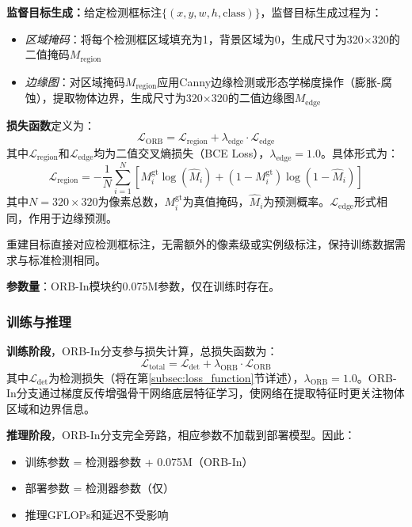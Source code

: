 \documentclass[journal]{IEEEtran}
\begin{document}
\textbf{监督目标生成：}给定检测框标注$\{(x, y, w, h, \text{class})\}$，监督目标生成过程为：
\begin{itemize}
    \item \textit{区域掩码}：将每个检测框区域填充为1，背景区域为0，生成尺寸为320$\times$320的二值掩码$M_{\text{region}}$
    \item \textit{边缘图}：对区域掩码$M_{\text{region}}$应用Canny边缘检测或形态学梯度操作（膨胀-腐蚀），提取物体边界，生成尺寸为320$\times$320的二值边缘图$M_{\text{edge}}$
\end{itemize}

\textbf{损失函数}定义为：
\begin{equation}
\mathcal{L}_{\text{ORB}} = \mathcal{L}_{\text{region}} + \lambda_{\text{edge}} \cdot \mathcal{L}_{\text{edge}}
\end{equation}
其中$\mathcal{L}_{\text{region}}$和$\mathcal{L}_{\text{edge}}$均为二值交叉熵损失（BCE Loss），$\lambda_{\text{edge}}=1.0$。具体形式为：
\begin{equation}
\mathcal{L}_{\text{region}} = -\frac{1}{N}\sum_{i=1}^{N}\left[M_i^{\text{gt}}\log(\hat{M}_i) + (1-M_i^{\text{gt}})\log(1-\hat{M}_i)\right]
\end{equation}
其中$N=320\times 320$为像素总数，$M_i^{\text{gt}}$为真值掩码，$\hat{M}_i$为预测概率。$\mathcal{L}_{\text{edge}}$形式相同，作用于边缘预测。

重建目标直接对应检测框标注，无需额外的像素级或实例级标注，保持训练数据需求与标准检测相同。

\textbf{参数量}：ORB-In模块约0.075M参数，仅在训练时存在。

\subsubsection{训练与推理}

\textbf{训练阶段}，ORB-In分支参与损失计算，总损失函数为：
\begin{equation}
\mathcal{L}_{\text{total}} = \mathcal{L}_{\text{det}} + \lambda_{\text{ORB}} \cdot \mathcal{L}_{\text{ORB}}
\end{equation}
其中$\mathcal{L}_{\text{det}}$为检测损失（将在第\ref{subsec:loss_function}节详述），$\lambda_{\text{ORB}}=1.0$。ORB-In分支通过梯度反传增强骨干网络底层特征学习，使网络在提取特征时更关注物体区域和边界信息。

\textbf{推理阶段}，ORB-In分支完全旁路，相应参数不加载到部署模型。因此：
\begin{itemize}
    \item 训练参数 = 检测器参数 + 0.075M（ORB-In）
    \item 部署参数 = 检测器参数（仅）
    \item 推理GFLOPs和延迟不受影响
\end{itemize}
\end{document}
